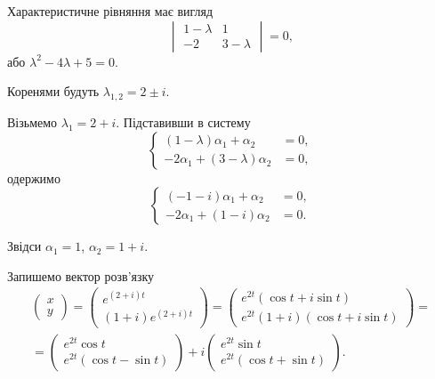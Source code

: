 \begin{solution}
    Характеристичне рівняння має вигляд
    \[ \begin{vmatrix}
        1 - \lambda & 1 \\
        -2 & 3 - \lambda 
    \end{vmatrix} = 0, \]
    або $\lambda^2 - 4 \lambda + 5 = 0$. \parvskip
    
    Коренями будуть $\lambda_{1,2} = 2 \pm i$. \parvskip
    
    Візьмемо $\lambda_1 = 2 + i$. Підставивши в систему
    \[ \left\{ \begin{aligned}
        (1 - \lambda) \alpha_1 + \alpha_2 &= 0, \\
        -2 \alpha_1 + (3 - \lambda) \alpha_2 &= 0, 
    \end{aligned} \right. \]
    одержимо 
    \[ \left\{ \begin{aligned}
        (-1 - i) \alpha_1 + \alpha_2 &= 0, \\
        -2 \alpha_1 + (1 - i) \alpha_2 &= 0.
    \end{aligned} \right. \]
    
    Звідси $\alpha_1 = 1$, $\alpha_2 = 1 + i$. \parvskip
    
    Запишемо вектор розв'язку
    \begin{multline*} \begin{pmatrix} x \\ y \end{pmatrix} = \begin{pmatrix} e^{(2 + i) t} \\ (1 + i) e^{(2 + i) t} \end{pmatrix} = \begin{pmatrix} e^{2 t} (\cos t + i \sin t) \\ e^{2 t} (1 + i) (\cos t + i \sin t) \end{pmatrix} = \\ = \begin{pmatrix} e^{2 t} \cos t \\ e^{2 t} (\cos t - \sin t) \end{pmatrix} + i \begin{pmatrix} e^{2 t} \sin t \\ e^{2 t} (\cos t + \sin t) \end{pmatrix}. \end{multline*}
    

\end{solution}
